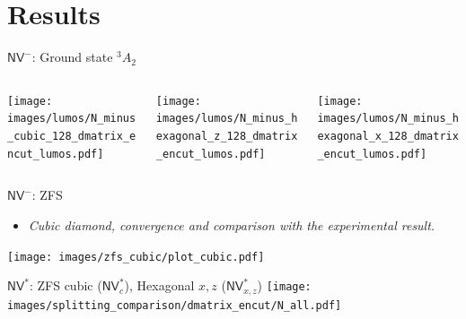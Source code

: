 \documentclass[notes=hide]{beamer}
\begin{document}
\section{Results} %

\begin{frame}{ $ \mathsf{NV}^{-} $: Ground state $ ^3A_{2} $ }
  \begin{center}
    \begin{columns}
      \begin{column}{0.3\textwidth}
        \texttt{[image: images/lumos/N\_minus\_cubic\_128\_dmatrix\_encut\_lumos.pdf]}
      \end{column}
      \begin{column}{0.3\textwidth}
        \texttt{[image: images/lumos/N\_minus\_hexagonal\_z\_128\_dmatrix\_encut\_lumos.pdf]}
      \end{column}
      \begin{column}{0.3\textwidth}
        \texttt{[image: images/lumos/N\_minus\_hexagonal\_x\_128\_dmatrix\_encut\_lumos.pdf]}
      \end{column}
    \end{columns}
  \end{center}
\end{frame}


\begin{frame}{$ \mathsf{NV}^{-} $: ZFS }
  \begin{itemize}
    \item
      \textit{Cubic diamond, convergence and comparison with the experimental result.}
  \end{itemize}
  \texttt{[image: images/zfs\_cubic/plot\_cubic.pdf]}
\end{frame}

\begin{frame}{$ \mathsf{NV}^{*} $: ZFS cubic ($ \mathsf{NV}^{*}_{c} $), Hexagonal $ x,z $ ($ \mathsf{NV}_{x,z}^{*} $)   }
  \texttt{[image: images/splitting\_comparison/dmatrix\_encut/N\_all.pdf]}
\end{frame}
\end{document}
